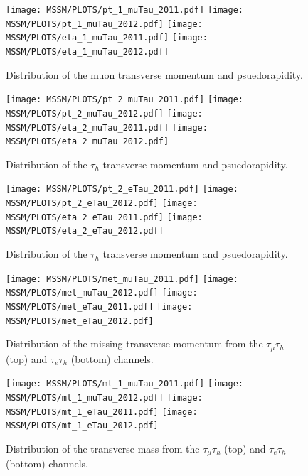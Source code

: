 \begin{figure}[htbp]
  \begin{center}
    \texttt{[image: MSSM/PLOTS/pt\_1\_muTau\_2011.pdf]}
    \texttt{[image: MSSM/PLOTS/pt\_1\_muTau\_2012.pdf]}
    \texttt{[image: MSSM/PLOTS/eta\_1\_muTau\_2011.pdf]}
    \texttt{[image: MSSM/PLOTS/eta\_1\_muTau\_2012.pdf]}
    \caption{
      Distribution of the muon transverse momentum and psuedorapidity.    }
    \label{figure:muKinematics}
  \end{center}
\end{figure}


\begin{figure}[htbp]
  \begin{center}
    \texttt{[image: MSSM/PLOTS/pt\_2\_muTau\_2011.pdf]}
    \texttt{[image: MSSM/PLOTS/pt\_2\_muTau\_2012.pdf]}
    \texttt{[image: MSSM/PLOTS/eta\_2\_muTau\_2011.pdf]}
    \texttt{[image: MSSM/PLOTS/eta\_2\_muTau\_2012.pdf]}
    \caption{
      Distribution of the $\tau_{h}$ transverse momentum and psuedorapidity.
    }
    \label{figure:MTauKinematics}
  \end{center}
\end{figure}

\begin{figure}[htbp]
  \begin{center}
    \texttt{[image: MSSM/PLOTS/pt\_2\_eTau\_2011.pdf]}
    \texttt{[image: MSSM/PLOTS/pt\_2\_eTau\_2012.pdf]}
    \texttt{[image: MSSM/PLOTS/eta\_2\_eTau\_2011.pdf]}
    \texttt{[image: MSSM/PLOTS/eta\_2\_eTau\_2012.pdf]}
    \caption{
      Distribution of the $\tau_{h}$ transverse momentum and psuedorapidity.}
    \label{figure:ETauKinematics}
  \end{center}
\end{figure}

\begin{figure}[htbp]
  \begin{center}
    \texttt{[image: MSSM/PLOTS/met\_muTau\_2011.pdf]}
    \texttt{[image: MSSM/PLOTS/met\_muTau\_2012.pdf]}
    \texttt{[image: MSSM/PLOTS/met\_eTau\_2011.pdf]}
    \texttt{[image: MSSM/PLOTS/met\_eTau\_2012.pdf]}
    \caption{
      Distribution of the missing transverse momentum from the $\tau_{\mu}\tau_{h}$ (top) and  $\tau_{e}\tau_{h}$ (bottom) channels.}
    \label{figure:MET}
  \end{center}
\end{figure}



\begin{figure}[htbp]
  \begin{center}
    \texttt{[image: MSSM/PLOTS/mt\_1\_muTau\_2011.pdf]}
    \texttt{[image: MSSM/PLOTS/mt\_1\_muTau\_2012.pdf]}
    \texttt{[image: MSSM/PLOTS/mt\_1\_eTau\_2011.pdf]}
    \texttt{[image: MSSM/PLOTS/mt\_1\_eTau\_2012.pdf]}
    \caption{
      Distribution of the transverse mass from the $\tau_{\mu}\tau_{h}$ (top) and  $\tau_{e}\tau_{h}$ (bottom) channels.}
    \label{figure:MT}
  \end{center}
\end{figure}


